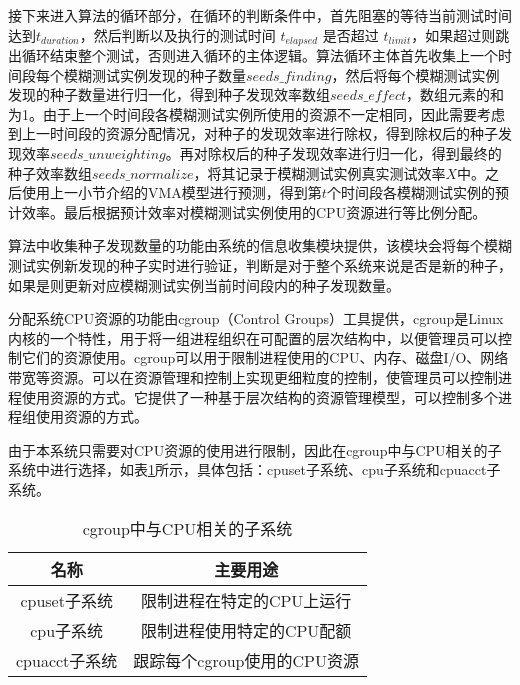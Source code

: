 \documentclass[master]{thesis-uestc}
\begin{document}
接下来进入算法的循环部分，在循环的判断条件中，首先阻塞的等待当前测试时间达到$t_{duration}$，然后判断以及执行的测试时间 $t_{elapsed}$ 是否超过 $t_{limit}$，如果超过则跳出循环结束整个测试，否则进入循环的主体逻辑。算法循环主体首先收集上一个时间段每个模糊测试实例发现的种子数量$seeds\_finding$，然后将每个模糊测试实例发现的种子数量进行归一化，得到种子发现效率数组$seeds\_effect$，数组元素的和为1。由于上一个时间段各模糊测试实例所使用的资源不一定相同，因此需要考虑到上一时间段的资源分配情况，对种子的发现效率进行除权，得到除权后的种子发现效率$seeds\_unweighting$。再对除权后的种子发现效率进行归一化，得到最终的种子效率数组$seeds\_normalize$，将其记录于模糊测试实例真实测试效率$X$中。之后使用上一小节介绍的VMA模型进行预测，得到第$t$个时间段各模糊测试实例的预计效率。最后根据预计效率对模糊测试实例使用的CPU资源进行等比例分配。

算法中收集种子发现数量的功能由系统的信息收集模块提供，该模块会将每个模糊测试实例新发现的种子实时进行验证，判断是对于整个系统来说是否是新的种子，如果是则更新对应模糊测试实例当前时间段内的种子发现数量。

分配系统CPU资源的功能由cgroup（Control Groups）工具提供，cgroup是Linux内核的一个特性，用于将一组进程组织在可配置的层次结构中，以便管理员可以控制它们的资源使用。cgroup可以用于限制进程使用的CPU、内存、磁盘I/O、网络带宽等资源。可以在资源管理和控制上实现更细粒度的控制，使管理员可以控制进程使用资源的方式。它提供了一种基于层次结构的资源管理模型，可以控制多个进程组使用资源的方式。


由于本系统只需要对CPU资源的使用进行限制，因此在cgroup中与CPU相关的子系统中进行选择，如表\ref{table_cgroup}所示，具体包括：cpuset子系统、cpu子系统和cpuacct子系统。

\begin{table}[!htbp]
    \caption{cgroup中与CPU相关的子系统}
    \begin{tabular}{cc}
    \toprule
    名称 & 主要用途 \\
    \midrule
    cpuset子系统 & 限制进程在特定的CPU上运行 \\
    cpu子系统 & 限制进程使用特定的CPU配额 \\
    cpuacct子系统 & 跟踪每个cgroup使用的CPU资源 \\
    \bottomrule
    \end{tabular}
    \label{table_cgroup}
    \vspace{6pt}
\end{table}
\end{document}
